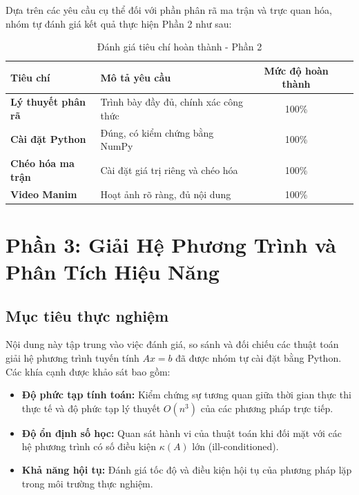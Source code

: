 \documentclass[a4paper]{article}
\begin{document}
Dựa trên các yêu cầu cụ thể đối với phần phân rã ma trận và trực quan hóa, nhóm tự đánh giá kết quả thực hiện Phần 2 như sau:

\begin{table}[H]
    \centering
    \renewcommand{\arraystretch}{1.4}
    \begin{tabular}{|p{4cm}|p{6.5cm}|c|c|}
        \hline
        \textbf{Tiêu chí} & \textbf{Mô tả yêu cầu} & \textbf{Mức độ hoàn thành} \\ \hline
        \textbf{Lý thuyết phân rã} & Trình bày đầy đủ, chính xác công thức  & 100\% \\ \hline
        \textbf{Cài đặt Python} & Đúng, có kiểm chứng bằng NumPy  & 100\% \\ \hline
        \textbf{Chéo hóa ma trận} & Cài đặt giá trị riêng và chéo hóa  & 100\% \\ \hline
        \textbf{Video Manim} & Hoạt ảnh rõ ràng, đủ nội dung  & 100\% \\ \hline
    \end{tabular}
    \caption{Đánh giá tiêu chí hoàn thành - Phần 2}
    \label{tab:criteria_part2}
\end{table}

\newpage
\section{Phần 3: Giải Hệ Phương Trình và Phân Tích Hiệu Năng}

\subsection{Mục tiêu thực nghiệm}
Nội dung này tập trung vào việc đánh giá, so sánh và đối chiếu các thuật toán giải hệ phương trình tuyến tính $Ax = b$ đã được nhóm tự cài đặt bằng Python. Các khía cạnh được khảo sát bao gồm:
\begin{itemize}
    \item \textbf{Độ phức tạp tính toán:} Kiểm chứng sự tương quan giữa thời gian thực thi thực tế và độ phức tạp lý thuyết $O(n^3)$ của các phương pháp trực tiếp.
    \item \textbf{Độ ổn định số học:} Quan sát hành vi của thuật toán khi đối mặt với các hệ phương trình có số điều kiện $\kappa(A)$ lớn (ill-conditioned).
    \item \textbf{Khả năng hội tụ:} Đánh giá tốc độ và điều kiện hội tụ của phương pháp lặp trong môi trường thực nghiệm.
\end{itemize}
\end{document}
